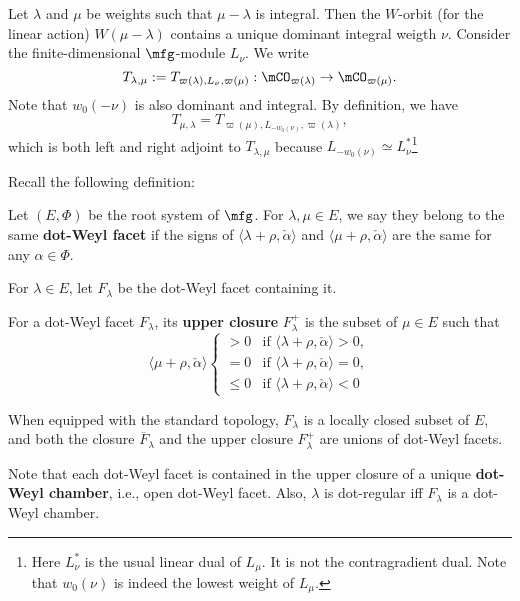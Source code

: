 	\begin{constr}
		Let $\lambda$ and $\mu$ be weights such that $\mu - \lambda$ is integral. Then the $W$-orbit (for the linear action) $W(\mu-\lambda)$ contains a unique dominant integral weigth $\nu$. Consider the finite-dimensional $\mfg$-module $L_\nu$. We write
		\[
			T_{\lambda,\mu}:= T_{\varpi(\lambda), L_\nu, \varpi(\mu)} : \mCO_{\varpi(\lambda)} \to \mCO_{\varpi(\mu)}.
		\] 
		Note that $w_0(-\nu)$ is also dominant and integral. By definition, we have
		\[
			T_{\mu,\lambda} = T_{\varpi(\mu), L_{-w_0(\nu)}, \varpi(\lambda)},
		\]
		which is both left and right adjoint to $T_{\lambda,\mu}$ because $L_{-w_0(\nu)} \simeq L_\nu^*$\footnote{Here $L_\nu^*$ is the usual linear dual of $L_\mu$. It is not the contragradient dual. Note that $w_0(\nu)$ is indeed the lowest weight of $L_\mu$.}
	\end{constr}

	Recall the following definition:

	\begin{defn}
		Let $(E,\Phi)$ be the root system of $\mfg$. For $\lambda,\mu \in E$, we say they belong to the same \textbf{dot-Weyl facet} if the signs of $\langle \lambda+\rho , \check\alpha \rangle$ and $\langle \mu+\rho , \check\alpha \rangle$ are the same for any $\alpha\in \Phi$. 

		For $\lambda\in E$, let $F_\lambda$ be the dot-Weyl facet containing it.
	\end{defn}

	

	\begin{defn}
		For a dot-Weyl facet $F_\lambda$, its \textbf{upper closure} $F_\lambda^+$ is the subset of $\mu\in E$ such that
		\[
			\langle \mu+\rho,\check \alpha \rangle \left\{ 
			\begin{array}{rcl}  
						> 0	&	\textrm{if } \langle \lambda+\rho,\check \alpha \rangle>0,\\
						=0	&	\textrm{if } \langle \lambda+\rho,\check \alpha \rangle=0,\\
						\le 0	&	\textrm{if } \langle \lambda+\rho,\check \alpha \rangle<0
			\end{array}\right.
		\]
	\end{defn}

	\begin{rem}
		When equipped with the standard topology, $F_\lambda$ is a locally closed subset of $E$, and both the closure $\overline{F}_\lambda$ and the upper closure $F_\lambda^+$ are unions of dot-Weyl facets. 

		Note that each dot-Weyl facet is contained in the upper closure of a unique \textbf{dot-Weyl chamber}, i.e., open dot-Weyl facet. Also, $\lambda$ is dot-regular iff $F_\lambda$ is a dot-Weyl chamber.
	\end{rem}

